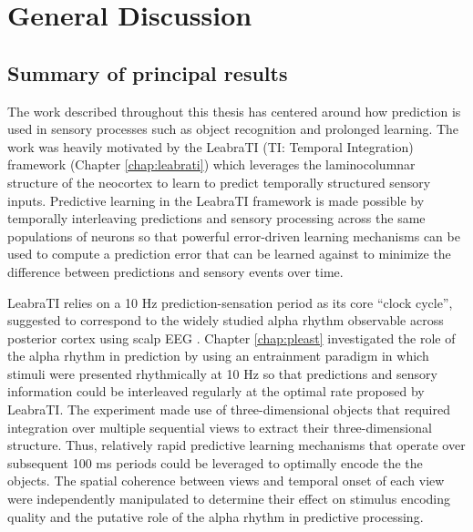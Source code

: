\documentclass[dwyatte_dissertation.tex]{subfiles}
\begin{document}
\sloppy

\chapter{General Discussion}
\section{Summary of principal results}
The work described throughout this thesis has centered around how prediction is used in sensory processes such as object recognition and prolonged learning. The work was heavily motivated by the LeabraTI (TI: Temporal Integration) framework (Chapter \ref{chap:leabrati}) which leverages the laminocolumnar structure of the neocortex \cite{Mountcastle97,BuxhoevedenCasanova02,HortonAdams05} to learn to predict temporally structured sensory inputs. Predictive learning in the LeabraTI framework is made possible by temporally interleaving predictions and sensory processing across the same populations of neurons so that powerful error-driven learning mechanisms \cite{OReillyMunakata00,OReillyMunakataFrankEtAl12} can be used to compute a prediction error that can be learned against to minimize the difference between predictions and sensory events over time.

LeabraTI relies on a 10 Hz prediction-sensation period as its core ``clock cycle'', suggested to correspond to the widely studied alpha rhythm observable across posterior cortex using scalp EEG \cite{PalvaPalva07,HanslmayrGrossKlimeschEtAl11,VanRullenBuschDrewesEtAl11}. Chapter \ref{chap:pleast} investigated the role of the alpha rhythm in prediction by using an entrainment paradigm \cite{SchroederLakatosKajikawaEtAl08,CalderoneLakatosButlerEtAlInPress} in which stimuli were presented rhythmically at 10 Hz so that predictions and sensory information could be interleaved regularly at the optimal rate proposed by LeabraTI. The experiment made use of three-dimensional objects that required integration over multiple sequential views to extract their three-dimensional structure. Thus, relatively rapid predictive learning mechanisms that operate over subsequent 100 ms periods could be leveraged to optimally encode the the objects. The spatial coherence between views and temporal onset of each view were independently manipulated to determine their effect on stimulus encoding quality and the putative role of the alpha rhythm in predictive processing.
\end{document}
